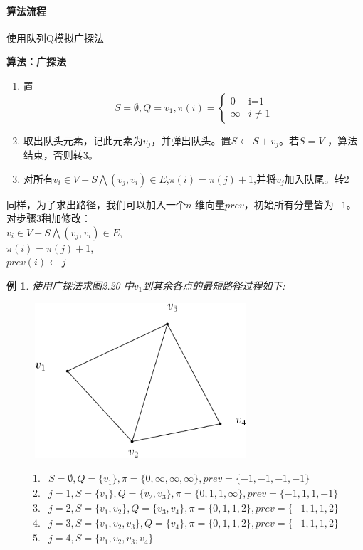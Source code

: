 \documentclass[11pt,a4paper,openany]{book}
\newtheorem{sample}{\textbf{例}}[section]
\begin{document}
\paragraph{算法流程}使用队列Q模拟广探法
\begin{shaded}
\textbf{算法：广探法}
\begin{enumerate}
  \item 置\begin{equation*}
    S=\emptyset ,Q={v_1} ,\pi(i)=
   \begin{cases}
   0 &\mbox{i=1}\\
    \infty &\mbox{$i\neq 1$}
   \end{cases}
  \end{equation*}
  \item 取出队头元素，记此元素为$v_j$，并弹出队头。置$S\leftarrow S +{v_j}$。若$S = V$ ，算法结束，否则转3。
  \item 对所有$v_i\in V-S\bigwedge(v_j,v_i)\in E$,$\pi(i)=\pi(j)+1$,并将$v_j$加入队尾。转2
\end{enumerate}
\end{shaded}
\indent 同样，为了求出路径，我们可以加入一个$n$ 维向量$prev$，初始所有分量皆为$-1$。对步骤3稍加修改：\\
\indent $v_i\in V-S\bigwedge(v_j,v_i)\in E$,\\
\indent $\pi(i)=\pi(j)+1$,\\
\indent $prev(i)\leftarrow j$
\begin{sample}\K
使用广探法求图2.20 中$v_1$到其余各点的最短路径过程如下:\\
\begin{figure}[H]
  \centering
  \includegraphics[width=0.7\textwidth]{2.201.png}\\
  \caption{}
\end{figure}
\begin{align*}
  1. &S=\emptyset,Q=\{v_1\},\pi=\{0,\infty,\infty,\infty \},prev=\{-1,-1,-1,-1\} \\
  2. &j=1,S=\{v_1\},Q=\{v_2,v_3\},\pi=\{0,1,1,\infty\},prev=\{-1,1,1,-1\}\\
  3. &j=2,S=\{v_1,v_2\},Q=\{v_3,v_4\},\pi=\{0,1,1,2\},prev=\{-1,1,1,2\}\\
  4. &j=3,S=\{v_1,v_2,v_3\},Q=\{v_4\},\pi=\{0,1,1,2\},prev=\{-1,1,1,2\}\\
  5. &j=4,S=\{v_1,v_2,v_3,v_4\}\\
\end{align*}
\end{sample}
\end{document}
